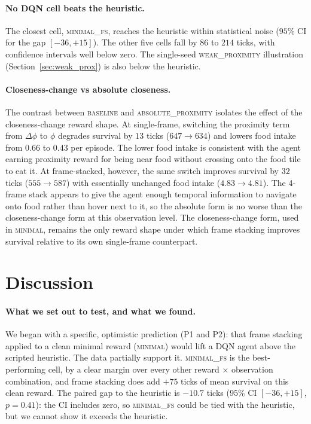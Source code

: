 \documentclass[12pt,a4paper,titlepage]{article}
\begin{document}
\paragraph{No DQN cell beats the heuristic.}
The closest cell, \textsc{minimal\_fs}, reaches the heuristic within statistical noise ($95\%$ CI for the gap $[-36, +15]$). The other five cells fall by $86$ to $214$ ticks, with confidence intervals well below zero. The single-seed \textsc{weak\_proximity} illustration (Section~\ref{sec:weak_prox}) is also below the heuristic.

\paragraph{Closeness-change vs absolute closeness.}
The contrast between \textsc{baseline} and \textsc{absolute\_proximity} isolates the effect of the closeness-change reward shape. At single-frame, switching the proximity term from $\Delta\phi$ to $\phi$ degrades survival by $13$ ticks ($647 \to 634$) and lowers food intake from $0.66$ to $0.43$ per episode. The lower food intake is consistent with the agent earning proximity reward for being near food without crossing onto the food tile to eat it. At frame-stacked, however, the same switch improves survival by $32$ ticks ($555 \to 587$) with essentially unchanged food intake ($4.83 \to 4.81$). The 4-frame stack appears to give the agent enough temporal information to navigate onto food rather than hover next to it, so the absolute form is no worse than the closeness-change form at this observation level. The closeness-change form, used in \textsc{minimal}, remains the only reward shape under which frame stacking improves survival relative to its own single-frame counterpart.

\section{Discussion}
\label{sec:discussion}

\paragraph{What we set out to test, and what we found.}
We began with a specific, optimistic prediction (P1 and P2): that frame stacking applied to a clean minimal reward (\textsc{minimal}) would lift a DQN agent above the scripted heuristic. The data partially support it. \textsc{minimal\_fs} is the best-performing cell, by a clear margin over every other reward $\times$ observation combination, and frame stacking does add $+75$ ticks of mean survival on this clean reward. The paired gap to the heuristic is $-10.7$ ticks ($95\%$ CI $[-36, +15]$, $p = 0.41$): the CI includes zero, so \textsc{minimal\_fs} could be tied with the heuristic, but we cannot show it exceeds the heuristic.
\end{document}
